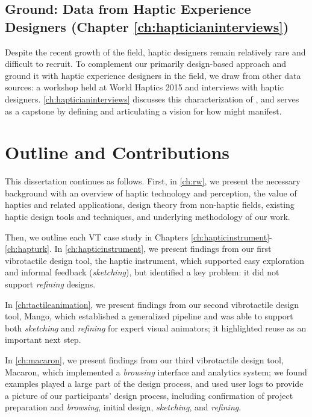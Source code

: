 \subsection{Ground: Data from Haptic Experience Designers (Chapter \ref{ch:hapticianinterviews})}
Despite the recent growth of the field, haptic designers remain relatively rare and difficult to recruit.
To complement our primarily design-based approach and ground it with haptic experience designers in the field, we draw from other data sources: a workshop held at World Haptics 2015 and interviews with haptic designers.
\autoref{ch:hapticianinterviews} discusses this characterization of \haxd, and serves as a capstone by defining \haxd and articulating a vision for how \haxd might manifest.




\section{Outline and Contributions}
This dissertation continues as follows.
First, in \autoref{ch:rw}, we present the necessary background with an overview of haptic technology and perception, the value of haptics and related applications,  design theory from non-haptic fields,  existing haptic design tools and techniques, and underlying methodology of our work.

Then, we outline each VT case study in Chapters \ref{ch:hapticinstrument}-\ref{ch:hapturk}.
In \autoref{ch:hapticinstrument}, we present findings from our first vibrotactile design tool, the haptic instrument, which supported easy exploration and informal feedback (\emph{sketching}), but identified a key problem: it did not support \emph{refining} designs.

In \autoref{ch:tactileanimation}, we present findings from our second vibrotactile design tool, Mango, which established a generalized pipeline and was able to support both \emph{sketching} and \emph{refining} for expert visual animators; it highlighted reuse as an important next step.

In \autoref{ch:macaron}, we present findings from our third vibrotactile design tool, Macaron, which implemented a \emph{browsing} interface and analytics system; we found examples played a large part of the design process, and used user logs to provide a picture of our participants' design process, including confirmation of project preparation and \emph{browsing}, initial design, \emph{sketching}, and \emph{refining}.

